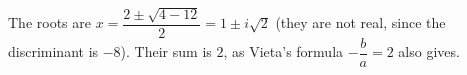 The roots are $x=\dfrac{2\pm\sqrt{4-12}}{2}=1\pm i\sqrt2$ (they are not real, since the discriminant is $-8$). Their sum is $\boxed{2}$, as Vieta's formula $-\dfrac {b}{a}=2$ also gives.
